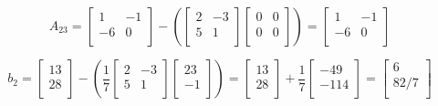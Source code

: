 \documentclass{article}
\begin{document}
$$A_{23} = \begin{bmatrix}
    1 & -1 \\
    -6 & 0 \\ 
\end{bmatrix} - (\begin{bmatrix}
    2 & -3 \\
    5 & 1 \\ 
\end{bmatrix} \begin{bmatrix}
    0 & 0 \\
    0 & 0 \\
\end{bmatrix}) = \begin{bmatrix}
    1 & -1 \\
    -6 & 0 \\
\end{bmatrix}$$ 

$$ b_2 = \begin{bmatrix}
    13 \\
    28 \\ 
\end{bmatrix}- (\frac{1}{7}\begin{bmatrix}
    2 & -3 \\
    5 & 1 \\ 
\end{bmatrix} \begin{bmatrix}
    23 \\ 
    -1 \\
\end{bmatrix}) = \begin{bmatrix}
    13 \\
    28 \\ 
\end{bmatrix} + \frac{1}{7} \begin{bmatrix}
    -49 \\
    -114 \\
\end{bmatrix} = \begin{bmatrix}
    6 \\
    82/7 \\
\end{bmatrix}$$
\end{document}
